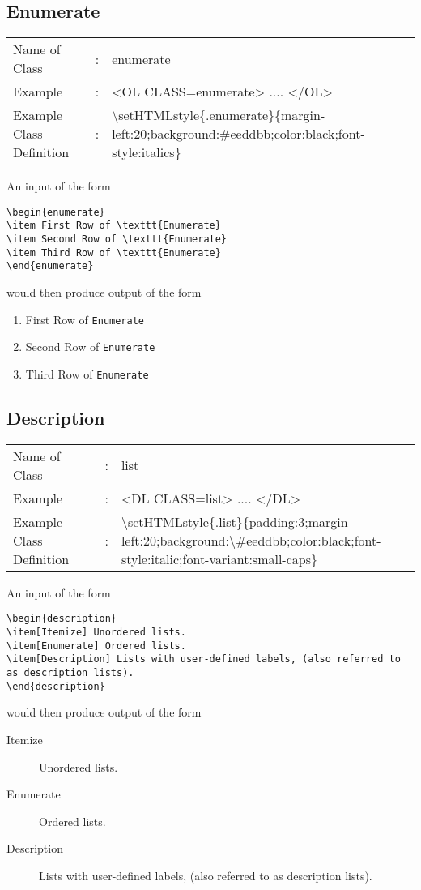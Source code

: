 \documentclass {article}
\begin{document}
\subsection{Enumerate}
\begin{tabular}{lll}
Name of Class & : & enumerate\\
Example & : & <OL CLASS=enumerate> .... </OL>\\
Example Class Definition & : & $\setminus$setHTMLstyle\{.enumerate\}\{margin-left:20;background:\#eeddbb;color:black;font-style:italics\}\\
\end{tabular}

An input of the form
\begin{verbatim}
\begin{enumerate}
\item First Row of \texttt{Enumerate}
\item Second Row of \texttt{Enumerate}
\item Third Row of \texttt{Enumerate}
\end{enumerate}
\end{verbatim}
would then produce output of the form\begin{enumerate}
\item First Row of \texttt{Enumerate}
\item Second Row of \texttt{Enumerate}
\item Third Row of \texttt{Enumerate}
\end{enumerate}

\subsection{Description}
\begin{tabular}{lll}
Name of Class & : & list\\
Example & : & <DL CLASS=list> .... </DL>\\
Example Class Definition & : & $\setminus$setHTMLstyle\{.list\}\{padding:3;margin-left:20;background:$\setminus$\#eeddbb;color:black;font-style:italic;font-variant:small-caps\}\\
\end{tabular}

An input of the form
\begin{verbatim}
\begin{description}
\item[Itemize] Unordered lists. 
\item[Enumerate] Ordered lists.
\item[Description] Lists with user-defined labels, (also referred to as description lists).
\end{description}
\end{verbatim}
would then produce output of the form
\begin{description}
\item[Itemize] Unordered lists. 
\item[Enumerate] Ordered lists.
\item[Description] Lists with user-defined labels, (also referred to as description lists).
\end{description}
\end{document}
